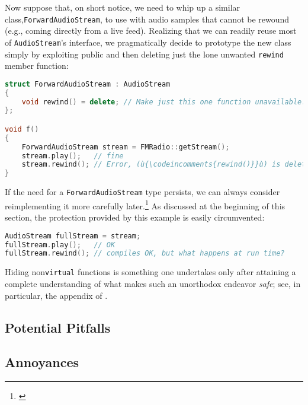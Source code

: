 Now suppose that, on short notice, we need to whip up a similar
class,\linebreak[4] \lstinline!ForwardAudioStream!, to use with audio samples that
cannot be rewound (e.g., coming directly from a live feed). Realizing
that we can readily reuse most of \lstinline!AudioStream!'s interface, we
pragmatically decide to prototype the new class simply by exploiting
public  and then deleting just the lone
unwanted \lstinline!rewind! member function:

\begin{lstlisting}[language=C++]
struct ForwardAudioStream : AudioStream
{
    void rewind() = delete; // Make just this one function unavailable.
};

void f()
{
    ForwardAudioStream stream = FMRadio::getStream();
    stream.play();   // fine
    stream.rewind(); // Error, (ù{\codeincomments{rewind()}}ù) is deleted.
}
\end{lstlisting}
    
\noindent If the need for a \lstinline!ForwardAudioStream! type persists, we can always
consider reimplementing it more carefully later.{\cprotect\footnote{\cite[sections 3.5.10.5 and 3.7.3, pp.~687--703 and 726--727]{lakos20}}} As discussed at the beginning of this section, the protection provided by this example is easily circumvented:
\begin{lstlisting}[language=C++]
AudioStream fullStream = stream;                                         
fullStream.play();   // OK                                                  
fullStream.rewind(); // compiles OK, but what happens at run time?
\end{lstlisting}

\noindent Hiding non\lstinline!virtual! functions is something one undertakes only after attaining a complete understanding of what makes such an unorthodox endeavor \emph{safe}; see, in particular, the appendix of .

\subsection[Potential Pitfalls]{Potential Pitfalls}\label{potential-pitfalls}

\hspace*{\fill}

\subsection[Annoyances]{Annoyances}\label{annoyances}

